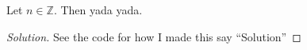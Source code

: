 \documentclass[12pt]{amsart}
\newcommand{\Z}{\mathbb{Z}} %
\newenvironment{theorem}[2][Theorem]{\begin{trivlist}
\item[\hskip \labelsep {\bfseries #1}\hskip \labelsep {\bfseries #2.}]}{\end{trivlist}}
\begin{document}
\begin{theorem}{x.yz}
Let \(n\in \Z\).  Then yada yada.
\end{theorem}
 
\begin{proof}[Solution] %
  See the code for how I made this say ``Solution''

\end{proof}
 
 
\end{document}
